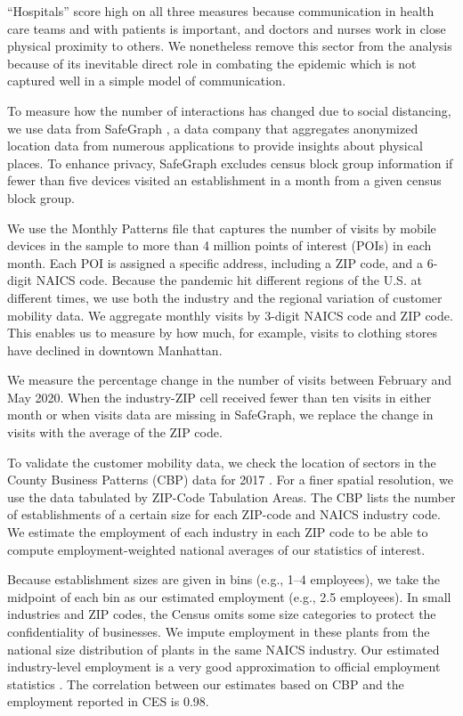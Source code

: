 \documentclass[10pt,letterpaper]{article}
\begin{document}
``Hospitals'' score high on all three measures because communication in health care teams and with patients is important, and doctors and nurses work in close physical proximity to others. We nonetheless remove this sector from the analysis because of its inevitable direct role in combating the epidemic which is not captured well in a simple model of communication.

To measure how the number of interactions has changed due to social distancing, we use data from SafeGraph \cite{SafeGraph2020-gn}, a data company that aggregates anonymized location data from numerous applications to provide insights about physical places. To enhance privacy, SafeGraph excludes census block group information if fewer than five devices visited an establishment in a month from a given census block group.

We use the Monthly Patterns file that captures the number of visits by mobile devices in the sample to more than 4 million points of interest (POIs) in each month. Each POI is assigned a specific address, including a ZIP code, and a 6-digit NAICS code. Because the pandemic hit different regions of the U.S. at different times, we use both the industry and the regional variation of customer mobility data. We aggregate monthly visits by 3-digit NAICS code and ZIP code. This enables us to measure by how much, for example, visits to clothing stores have declined in downtown Manhattan.

We measure the percentage change in the number of visits between February and May 2020. When the industry-ZIP cell received fewer than ten visits in either month or when visits data are missing in SafeGraph, we replace the change in visits with the average of the ZIP code.

To validate the customer mobility data, we check the location of sectors in the County Business Patterns (CBP) data for 2017 \cite{CBP}. For a finer spatial resolution, we use the data tabulated by ZIP-Code Tabulation Areas. The CBP lists the number of establishments of a certain size for each ZIP-code and NAICS industry code. We estimate the employment of each industry in each ZIP code to be able to compute employment-weighted national averages of our statistics of interest.

Because establishment sizes are given in bins (e.g., 1--4 employees), we take the midpoint of each bin as our estimated employment (e.g., 2.5 employees). In small industries and ZIP codes, the Census omits some size categories to protect the confidentiality of businesses. We impute employment in these plants from the national size distribution of plants in the same NAICS industry. Our estimated industry-level employment is a very good approximation to official employment statistics \cite{CES}. The correlation between our estimates based on CBP and the employment reported in CES is 0.98.
\end{document}
